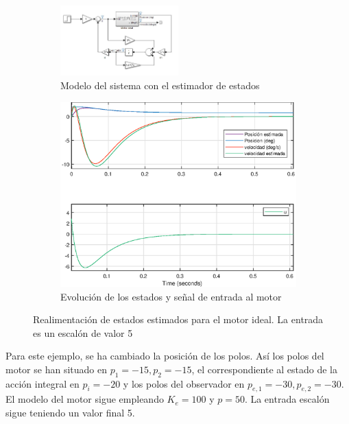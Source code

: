 \documentclass[10pt,a4paper]{report}
\begin{document}
\begin{figure}
\centering
\begin{subfigure}{\textwidth}
\centering
\includegraphics[width=0.5\textwidth]{estimador.jpg}
\caption{Modelo del sistema con el estimador de estados}
\label{f32a}
\end{subfigure}
\begin{subfigure}{\textwidth}
\centering
\includegraphics[scale=0.6]{estimador.eps}
\caption{Evolución de los estados y señal de entrada al motor}
\label{f32b}
\end{subfigure}
\caption{Realimentación de estados estimados para el motor ideal. La entrada es un escalón de valor 5}
\end{figure}




Para este ejemplo, se ha cambiado la posición de los polos. Así los polos del motor se han situado en $p_1 = -15, p_2 = -15$, el correspondiente al estado de la acción integral en $p_i = -20$ y los polos del observador en $p_{e,1} = -30, p_{e,2} = -30$. El modelo del motor sigue empleando $K_e = 100$ y $p = 50$. La entrada escalón sigue teniendo un valor final 5.
\end{document}
